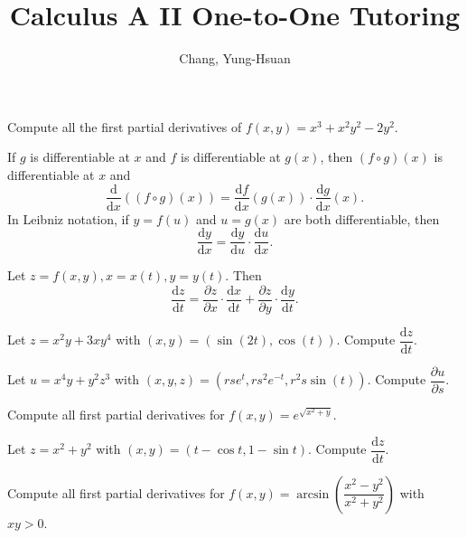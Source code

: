 \documentclass[11pt]{article}
\title{\textbf{Calculus A II One-to-One Tutoring}}
\author{Chang, Yung-Hsuan}
\theoremstyle{break}
\newcommand{\differentiate}[1]{\dfrac{\dd}{\dd{#1}}}
\newcommand{\derivative}[2]{\dfrac{\dd{#1}}{\dd{#2}}}
\newcommand{\pderivative}[2]{\dfrac{\partial {#1}}{\partial {#2}}}
\newcommand{\dd}{\text{d}}
\numberwithin{equation}{theorem}
\begin{document}
\maketitle

\begin{example}
    Compute all the first partial derivatives of $f(x, y)=x^3+x^2y^2-2y^2$.
\end{example}
\vspace{8em}

\begin{recall}
    If $g$ is differentiable at $x$ and $f$ is differentiable at $g(x)$, then $(f\circ g)(x)$ is differentiable at $x$ and $$\differentiate{x}\left((f\circ g)(x)\right)=\derivative{f}{x}(g(x))\cdot\derivative{g}{x}(x).$$
    In Leibniz notation, if $y=f(u)$ and $u=g(x)$ are both differentiable, then $$\derivative{y}{x}=\derivative{y}{u}\cdot\derivative{u}{x}.$$
\end{recall}

\begin{theorem}
    Let $z=f(x, y), x=x(t), y=y(t)$. Then $$\derivative{z}{t}=\pderivative{z}{x}\cdot\derivative{x}{t}+\pderivative{z}{y}\cdot\derivative{y}{t}.$$
\end{theorem}

\begin{example}
    Let $z=x^2y+3xy^4$ with $(x, y)=(\sin(2t), \cos(t))$. Compute $\derivative{z}{t}$.
\end{example}
\vspace{15em}

\begin{example}
    Let $u=x^4y+y^2z^3$ with $(x, y, z)=(rse^t, rs^2e^{-t}, r^2s\sin(t))$. Compute $\pderivative{u}{s}$.
\end{example}
\vspace{15em}

\begin{example}
    Compute all first partial derivatives for $f(x, y)=e^{\sqrt{x^2+y}}$.
\end{example}
\vspace{15em}

\begin{example}
    Let $z=x^2+y^2$ with $(x, y)=(t-\cos t, 1-\sin t)$. Compute $\derivative{z}{t}$.
\end{example}
\vspace{15em}

\begin{example}
    Compute all first partial derivatives for $f(x, y)=\arcsin\left(\dfrac{x^2-y^2}{x^2+y^2}\right)$ with $xy>0$.
\end{example}
\newpage
\end{document}
